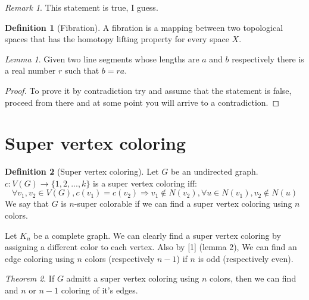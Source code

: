 \documentclass[12pt]{article}
\theoremstyle{definition}
\newtheorem{definition}{Definition}[section]
\theoremstyle{remark}
\newtheorem*{remark}{Remark}
\newtheorem{theorem}{Theorem}[section]
\newtheorem{lemma}[theorem]{Lemma}
\begin{document}
\begin{remark}
    This statement is true, I guess.
\end{remark}

\begin{definition}[Fibration]
    A fibration is a mapping between two topological spaces that has the homotopy lifting property for every space $X$.
\end{definition}

\begin{lemma}
    Given two line segments whose lengths are $a$ and $b$ respectively there 
    is a real number $r$ such that $b=ra$.
\end{lemma}
    
\begin{proof}
    To prove it by contradiction try and assume that the statement is false,
    proceed from there and at some point you will arrive to a contradiction.
\end{proof}


\newpage    
\section{Super vertex coloring}

\begin{definition}[Super vertex coloring]
    Let $G$ be an undirected graph.\\ $c: V(G) \rightarrow \{1, 2, ... , k\}$ is a super vertex coloring iff: 
    $$\forall v_1, v_2 \in V(G), c(v_1) = c(v_2) \Rightarrow v_1 \notin N(v_2), \forall u \in N(v_1), v_2\notin N(u)$$
    We say that $G$ is $n$-super colorable if we can find a super vertex coloring using $n$ colors.
\end{definition}

Let $K_n$ be a complete graph. We can clearly find a super vertex coloring by assigning a different color to each vertex. Also by [1] (lemma 2), We
can find an edge coloring using $n$ colors (respectively $n-1$) if $n$ is odd (respectively even).

\begin{theorem}
    If $G$ admitt a super vertex coloring using $n$ colors, then we can find and $n$ or $n-1$ coloring of it's edges.
\end{theorem}
\end{document}
